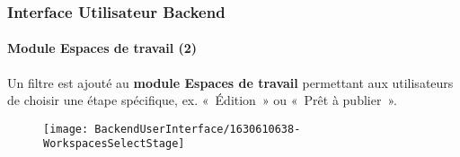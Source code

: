 %

\begin{frame}[fragile]
	\frametitle{Interface Utilisateur Backend}
	\framesubtitle{Module Espaces de travail (2)}

	Un filtre est ajouté au \textbf{module Espaces de travail} permettant aux utilisateurs
	de choisir une étape spécifique, ex. «~Édition~» ou «~Prêt à publier~».

	\begin{figure}
		\texttt{[image: BackendUserInterface/1630610638-WorkspacesSelectStage]}
	\end{figure}

\end{frame}

